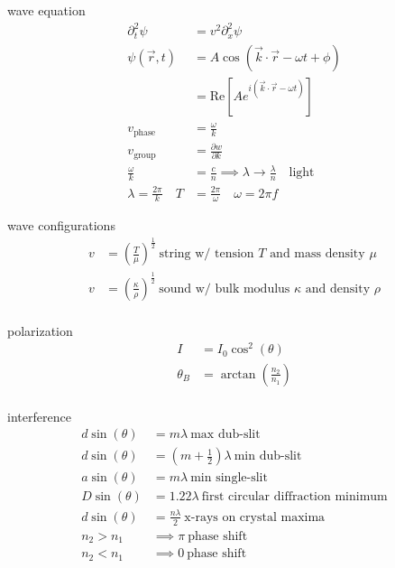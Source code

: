 \documentclass[avery5388, frame]{flashcards}
\begin{document}
\begin{flashcard}{wave equation}
  {
    \vspace{-0.25cm}
    \begin{align*}
      \partial_{t}^{2} \psi &= v^{2} \partial_{x}^{2} \psi\\
      \psi(\vec{r}, t) &= A \cos(\vec{k} \cdot \vec{r} - \omega t + \phi)\\
      &= \textrm{Re}[A e^{i(\vec{k} \cdot \vec{r} - \omega t)}]\\
      v_{\textrm{phase}} &= \frac{\omega}{k}\\
      v_{\textrm{group}} &= \frac{\partial w}{\partial k}\\
      \frac{\omega}{k} &= \frac{c}{n} \implies \lambda \rightarrow \frac{\lambda}{n} \quad \textrm{light}\\
      \lambda = \frac{2 \pi}{k} \quad T &= \frac{2 \pi}{\omega} \quad \omega = 2 \pi f
    \end{align*}
  }
\end{flashcard}

\begin{flashcard}{wave configurations}
  {
    \begin{align*}
      v &= (\frac{T}{\mu})^{\frac{1}{2}} \ \textrm{string w/ tension $T$ and mass density $\mu$}\\
      v &= (\frac{\kappa}{\rho})^{\frac{1}{2}} \ \textrm{sound w/ bulk modulus $\kappa$ and density $\rho$}\\
    \end{align*}
  }
\end{flashcard}

\begin{flashcard}{polarization}
  {
    \begin{align*}
      I &= I_{0} \cos^{2}(\theta)\\
      \theta_{B} &= \arctan(\frac{n_{2}}{n_{1}})\\
    \end{align*}
  }
\end{flashcard}

\begin{flashcard}{interference}
  {
    \begin{align*}
      d \sin(\theta) &= m \lambda \ \textrm{max dub-slit}\\
      d \sin(\theta) &= (m + \frac{1}{2}) \lambda \ \textrm{min dub-slit}\\
      a \sin(\theta) &= m \lambda \ \textrm{min single-slit}\\
      D \sin(\theta) &= 1.22 \lambda \ \textrm{first circular diffraction minimum}\\
      d \sin(\theta) &= \frac{n \lambda}{2} \ \textrm{x-rays on crystal maxima}\\
      n_{2} > n_{1} &\implies \pi \ \textrm{phase shift}\\
      n_{2} < n_{1} &\implies 0 \ \textrm{phase shift}
    \end{align*}
  }
\end{flashcard}
\end{document}
